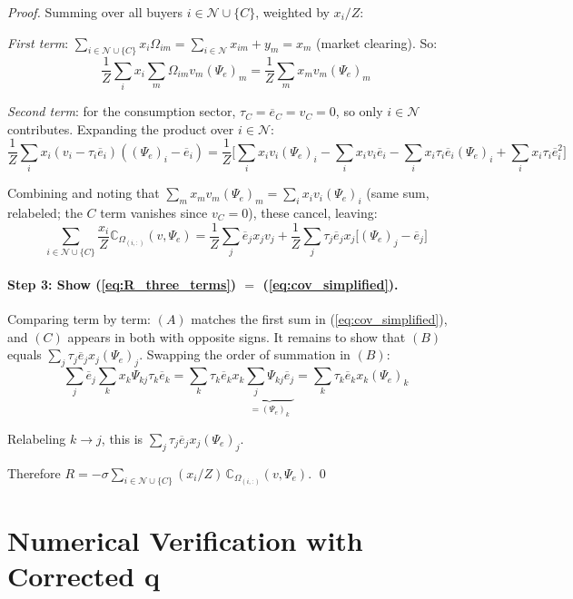 \documentclass[11pt]{article}
\newcommand{\N}{\mathcal{N}}
\begin{document}
\begin{proof}
Summing over all buyers $i \in \N \cup \{C\}$, weighted by $x_i/Z$:

\textit{First term}: $\sum_{i \in \N \cup \{C\}} x_i\Omega_{im} = \sum_{i \in \N}x_{im} + y_m = x_m$ (market clearing). So:
$$\frac{1}{Z}\sum_i x_i \sum_m \Omega_{im}v_m(\Psi_e)_m = \frac{1}{Z}\sum_m x_m v_m (\Psi_e)_m$$

\textit{Second term}: for the consumption sector, $\tau_C = \overline{e}_C = v_C = 0$, so only $i \in \N$ contributes. Expanding the product over $i \in \N$:
$$\frac{1}{Z}\sum_i x_i(v_i - \tau_i\overline{e}_i)((\Psi_e)_i - \overline{e}_i) = \frac{1}{Z}\bigg[\sum_i x_i v_i(\Psi_e)_i - \sum_i x_i v_i\overline{e}_i - \sum_i x_i\tau_i\overline{e}_i(\Psi_e)_i + \sum_i x_i\tau_i\overline{e}_i^2\bigg]$$

Combining and noting that $\sum_m x_m v_m(\Psi_e)_m = \sum_i x_i v_i(\Psi_e)_i$ (same sum, relabeled; the $C$ term vanishes since $v_C = 0$), these cancel, leaving:
\begin{equation}
    \label{eq:cov_simplified}
    \sum_{i \in \N \cup \{C\}} \frac{x_i}{Z}\mathbb{C}_{\Omega_{(i,:)}}(v, \Psi_e) = \frac{1}{Z}\sum_j \overline{e}_j x_j v_j + \frac{1}{Z}\sum_j \tau_j\overline{e}_j x_j\big[(\Psi_e)_j - \overline{e}_j\big]
\end{equation}

\paragraph{Step 3: Show (\ref{eq:R_three_terms}) $=$ (\ref{eq:cov_simplified}).}
Comparing term by term: $(A)$ matches the first sum in (\ref{eq:cov_simplified}), and $(C)$ appears in both with opposite signs. It remains to show that $(B)$ equals $\sum_j \tau_j\overline{e}_j x_j(\Psi_e)_j$. Swapping the order of summation in $(B)$:
$$\sum_j \overline{e}_j \sum_k x_k\Psi_{kj}\tau_k\overline{e}_k = \sum_k \tau_k\overline{e}_k x_k \underbrace{\sum_j \Psi_{kj}\overline{e}_j}_{= (\Psi_e)_k} = \sum_k \tau_k\overline{e}_k x_k (\Psi_e)_k$$

Relabeling $k \to j$, this is $\sum_j \tau_j\overline{e}_j x_j(\Psi_e)_j$. \checkmark

Therefore $R = -\sigma\sum_{i \in \N \cup \{C\}} (x_i/Z)\,\mathbb{C}_{\Omega_{(i,:)}}(v, \Psi_e)$. \qed
\end{proof}


\section{Numerical Verification with Corrected $\mathbf{q}$}
\end{document}
